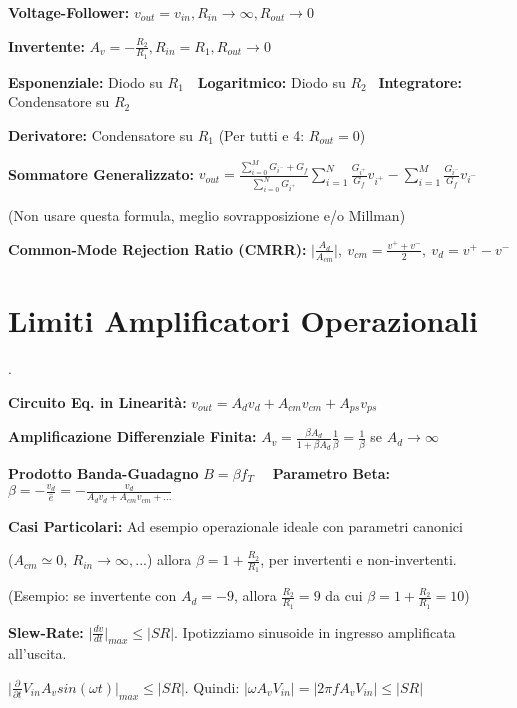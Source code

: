 \documentclass[12pt]{extarticle}
\begin{document}
{\bf Voltage-Follower:} $\displaystyle v_{out} = v_{in}, R_{in} \to \infty, R_{out} \to 0$

{\bf Invertente:} $\displaystyle A_v = -\frac{R_2}{R_1}, R_{in} = R_1, R_{out} \to 0$

{\bf Esponenziale:} Diodo su $R_1$\ \ {\bf Logaritmico:} Diodo su $R_2$ \ {\bf Integratore:} Condensatore su $R_2$

{\bf Derivatore:} Condensatore su $R_1$ (Per tutti e 4: $R_{out} = 0$)


{\bf Sommatore Generalizzato:} $\displaystyle v_{out} = \frac{\sum_{i=0}^M G_{i^-} + G_f}{\sum_{i=0}^N G_{i^+}} \sum_{i=1}^N \frac{G_{i^+}}{G_f}v_{i^+}-\sum_{i=1}^M\frac{G_{i^-}}{G_f}v_{i^-}$ 

(Non usare questa formula, meglio sovrapposizione e/o Millman)

{\bf Common-Mode Rejection Ratio (CMRR):} $\displaystyle \bigg |\frac{A_d}{A_{cm}} \bigg |, \ v_{cm} = \frac{v^++v^-}{2}, \ v_d = v^+-v^-$


\section{Limiti Amplificatori Operazionali}.

{\bf Circuito Eq. in Linearità:} $\displaystyle v_{out} = A_dv_d +A_{cm}v_{cm}+A_{ps}v_{ps}$

{\bf Amplificazione Differenziale Finita:} $\displaystyle A_v = \frac{\beta A_d}{1+\beta A_d}\frac{1}{\beta} = \frac{1}{\beta}$ se $A_d \to \infty$

{\bf Prodotto Banda-Guadagno} $\displaystyle B = \beta f_T$ \ \ {\bf Parametro Beta:} $\displaystyle \beta = -\frac{v_d}{\hat{e}} = -\frac{v_d}{A_dv_d + A_{cm}v_{cm} + ...}$

{\bf Casi Particolari:} Ad esempio operazionale ideale con parametri canonici 

($A_{cm} \simeq 0,\ R_{in} \to \infty, ...$) allora $\displaystyle \beta = 1 + \frac{R_2}{R_1}$, per invertenti e non-invertenti.

(Esempio: se invertente con $A_d = -9$, allora $\frac{R_2}{R_1} = 9$ da cui $\beta = 1 + \frac{R_2}{R_1} = 10$)

{\bf Slew-Rate:} $\displaystyle \bigg |\frac{dv}{dt}\bigg |_{max} \leq \bigg |SR\bigg |.$ Ipotizziamo sinusoide in ingresso amplificata all'uscita.

$\displaystyle \bigg |\frac{\partial}{\partial{t}} V_{in}A_vsin(\omega t)\bigg |_{max}\leq \bigg |SR\bigg |$. Quindi: $\displaystyle \bigg |\omega A_vV_{in}\bigg | = \bigg |2\pi fA_vV_{in}\bigg | \leq \bigg | SR \bigg |$
\end{document}
